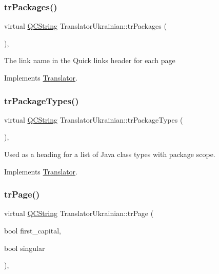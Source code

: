 \subsubsection{\texorpdfstring{trPackages()}{trPackages()}}
{\footnotesize\ttfamily virtual \mbox{\hyperlink{class_q_c_string}{Q\+C\+String}} Translator\+Ukrainian\+::tr\+Packages (\begin{DoxyParamCaption}{ }\end{DoxyParamCaption})\hspace{0.3cm}{\ttfamily [inline]}, {\ttfamily [virtual]}}

The link name in the Quick links header for each page 

Implements \mbox{\hyperlink{class_translator}{Translator}}.

\mbox{\label{class_translator_ukrainian_a5dc66edef926dc0376a5c4ed95fdfc3a}} 
\subsubsection{\texorpdfstring{trPackageTypes()}{trPackageTypes()}}
{\footnotesize\ttfamily virtual \mbox{\hyperlink{class_q_c_string}{Q\+C\+String}} Translator\+Ukrainian\+::tr\+Package\+Types (\begin{DoxyParamCaption}{ }\end{DoxyParamCaption})\hspace{0.3cm}{\ttfamily [inline]}, {\ttfamily [virtual]}}

Used as a heading for a list of Java class types with package scope. 

Implements \mbox{\hyperlink{class_translator}{Translator}}.

\mbox{\label{class_translator_ukrainian_ac799c9d7817111e3bab0b8ce228df7d0}} 
\subsubsection{\texorpdfstring{trPage()}{trPage()}}
{\footnotesize\ttfamily virtual \mbox{\hyperlink{class_q_c_string}{Q\+C\+String}} Translator\+Ukrainian\+::tr\+Page (\begin{DoxyParamCaption}\item[{bool}]{first\+\_\+capital,  }\item[{bool}]{singular }\end{DoxyParamCaption})\hspace{0.3cm}{\ttfamily [inline]}, {\ttfamily [virtual]}}

